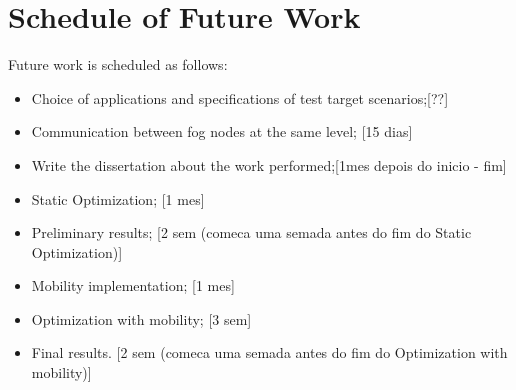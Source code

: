 \section{Schedule of Future Work}
\label{sec:Schedule}

Future work is scheduled as follows:
\begin{itemize}
  \item Choice of applications and specifications of test target scenarios;[??]
  \item Communication between fog nodes at the same level; [15 dias]
  \item Write the dissertation about the work performed;[1mes depois do inicio - fim]
  \item Static Optimization; [1 mes]
  \item Preliminary results; [2 sem (comeca uma semada antes do fim do Static Optimization)]
  \item Mobility implementation; [1 mes]
  \item Optimization with mobility; [3 sem]
  \item Final results. [2 sem (comeca uma semada antes do fim do Optimization with mobility)]
\end{itemize}
